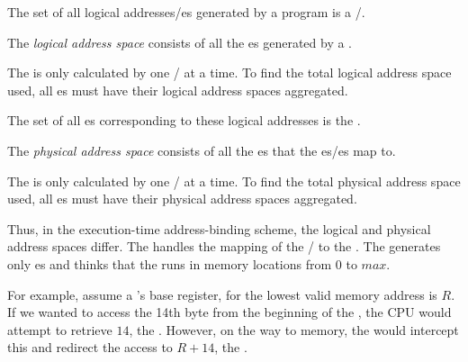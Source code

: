 The set of all logical addresses/es generated by a program is a /.

\begin{definition}\label{def:Logical_Address_Space}
  The \emph{logical address space} consists of all the es generated by a .

  \begin{remark}
    The  is only calculated by one / at a time.
    To find the total logical address space used, all es must have their logical address spaces aggregated.
  \end{remark}
\end{definition}

The set of all es corresponding to these logical addresses is the .

\begin{definition}\label{def:Physical_Address_Space}
  The \emph{physical address space} consists of all the es that the es/es map to.

  \begin{remark}
    The  is only calculated by one / at a time.
    To find the total physical address space used, all es must have their physical address spaces aggregated.
  \end{remark}
\end{definition}

Thus, in the execution-time address-binding scheme, the logical and physical address spaces differ.
The  handles the mapping of the / to the .
The  generates only es and thinks that the  runs in memory locations from $0$ to $max$.

For example, assume a 's base register, for the lowest valid memory address is $R$.
If we wanted to access the 14th byte from the beginning of the , the CPU would attempt to retrieve $14$, the .
However, on the way to memory, the  would intercept this and redirect the access to $R+14$, the .

